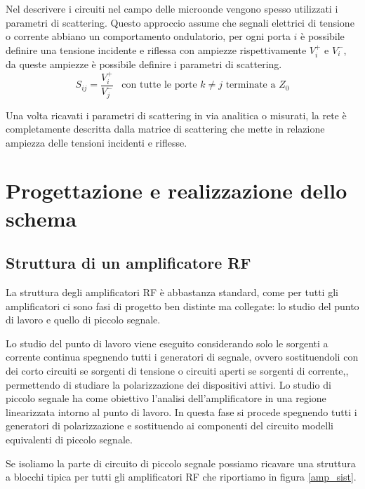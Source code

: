 \documentclass[12pt,oneside]{book}
\begin{document}

Nel descrivere i circuiti nel campo delle microonde vengono spesso utilizzati i parametri di scattering. Questo approccio assume che segnali elettrici di tensione o corrente abbiano un comportamento ondulatorio, per ogni porta $i$ è possibile definire una tensione incidente e riflessa con ampiezze rispettivamente $V_{i}^{+}$ e $V_{i}^{-}$, da queste ampiezze è possibile definire i parametri di scattering.
\begin{equation}
    S_{ij} = \dfrac{V_{i}^{+}}{V_{j}^{-}} \hspace{10pt} \text{con tutte le porte $k \neq j$ terminate a $Z_0$}
\end{equation}

Una volta ricavati i parametri di scattering in via analitica o misurati, la rete è completamente descritta dalla matrice di scattering che mette in relazione ampiezza delle tensioni incidenti e riflesse.



\chapter{Progettazione e realizzazione dello schema}
\section{Struttura di un amplificatore RF}
La struttura degli amplificatori RF è abbastanza standard, come per tutti gli amplificatori ci sono fasi di progetto ben distinte ma collegate: lo studio del punto di lavoro e quello di piccolo segnale.

Lo studio del punto di lavoro viene eseguito considerando solo le sorgenti a corrente continua spegnendo tutti i generatori di segnale, ovvero sostituendoli con dei corto circuiti se sorgenti  di tensione o circuiti aperti se sorgenti di corrente,, permettendo di studiare la polarizzazione dei dispositivi attivi.
Lo studio di piccolo segnale ha come obiettivo l'analisi dell'amplificatore in una regione linearizzata intorno al punto di lavoro. In questa fase si procede spegnendo tutti i generatori di polarizzazione e sostituendo ai componenti del circuito modelli equivalenti di piccolo segnale.

Se isoliamo la parte di circuito di piccolo segnale possiamo ricavare una struttura a blocchi tipica per tutti gli amplificatori RF che riportiamo in figura \ref{amp_sist}.
\end{document}
